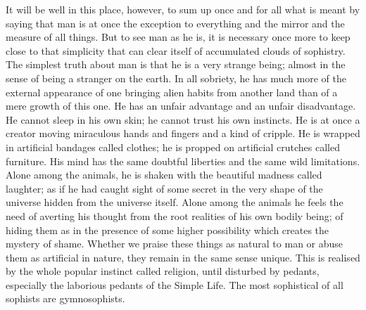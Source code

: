 It will be well in this place, however, to sum up once and for all what is meant by saying that man is at once the exception to everything and the mirror and the measure of all things. But to see man as he is, it is necessary once more to keep close to that simplicity that can clear itself of accumulated clouds of sophistry. The simplest truth about man is that he is a very strange being; almost in the sense of being a stranger on the earth. In all sobriety, he has much more of the external appearance of one bringing alien habits from another land than of a mere growth of this one. He has an unfair advantage and an unfair disadvantage. He cannot sleep in his own skin; he cannot trust his own instincts. He is at once a creator moving miraculous hands and fingers and a kind of cripple. He is wrapped in artificial bandages called clothes; he is propped on artificial crutches called furniture. His mind has the same doubtful liberties and the same wild limitations. Alone among the animals, he is shaken with the beautiful madness called laughter; as if he had caught sight of some secret in the very shape of the universe hidden from the universe itself. Alone among the animals he feels the need of averting his thought from the root realities of his own bodily being; of hiding them as in the presence of some higher possibility which creates the mystery of shame. Whether we praise these things as natural to man or abuse them as artificial in nature, they remain in the same sense unique. This is realised by the whole popular instinct called religion, until disturbed by pedants, especially the laborious pedants of the Simple Life. The most sophistical of all sophists are gymnosophists.

